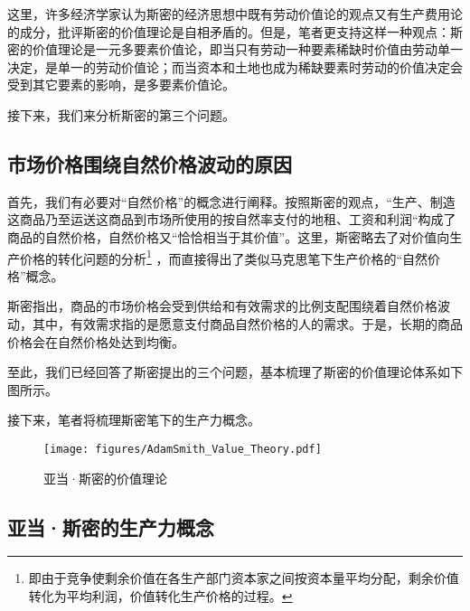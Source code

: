 这里，许多经济学家认为斯密的经济思想中既有劳动价值论的观点又有生产费用论的成分，批评斯密的价值理论是自相矛盾的\cite[136]{CaiJiMingCongGuDianZhengZhiJingJiXueDaoZhongGuoTeSeSheHuiZhuYiZhengZhiJingJiXueJiYuZhongGuoShiJiaoDeZhengZhiJingJiXueYanBianShangCe2023}\cite[294]{YueSeFu*XiongBiTeJingJiFenXiShiDi1Juan2017}。但是，笔者更支持这样一种观点：斯密的价值理论是一元多要素价值论\cite[136]{CaiJiMingCongGuDianZhengZhiJingJiXueDaoZhongGuoTeSeSheHuiZhuYiZhengZhiJingJiXueJiYuZhongGuoShiJiaoDeZhengZhiJingJiXueYanBianShangCe2023}，即当只有劳动一种要素稀缺时价值由劳动单一决定，是单一的劳动价值论；而当资本和土地也成为稀缺要素时劳动的价值决定会受到其它要素的影响，是多要素价值论。

接下来，我们来分析斯密的第三个问题。

\subsection{市场价格围绕自然价格波动的原因}

首先，我们有必要对“自然价格”的概念进行阐释。按照斯密的观点，“生产、制造这商品乃至运送这商品到市场所使用的按自然率支付的地租、工资和利润“构成了商品的自然价格，自然价格又“恰恰相当于其价值”\cite[49]{YaDang*SiMiGuoFuLun2015}。这里，斯密略去了对价值向生产价格的转化问题的分析\footnote{即由于竞争使剩余价值在各生产部门资本家之间按资本量平均分配，剩余价值转化为平均利润，价值转化生产价格的过程\cite[99]{ZhongXiangTanMaKeSiLaoDongJieZhiLunZhengLunJiQiShi2018}。}
，而直接得出了类似马克思笔下生产价格的“自然价格”概念。

斯密指出，商品的市场价格会受到供给和有效需求的比例支配围绕着自然价格波动，其中，有效需求指的是愿意支付商品自然价格的人的需求\cite[50]{YaDang*SiMiGuoFuLun2015}。于是，长期的商品价格会在自然价格处达到均衡\cite[50]{YaDang*SiMiGuoFuLun2015}。

至此，我们已经回答了斯密提出的三个问题，基本梳理了斯密的价值理论体系如下图所示。

接下来，笔者将梳理斯密笔下的生产力概念。

\begin{figure}
    \centering
    \caption{亚当·斯密的价值理论}
    \label{figures:AdamSmith_Value_Theory}
    \texttt{[image: figures/AdamSmith\_Value\_Theory.pdf]}
\end{figure}

\subsection{亚当·斯密的生产力概念}

